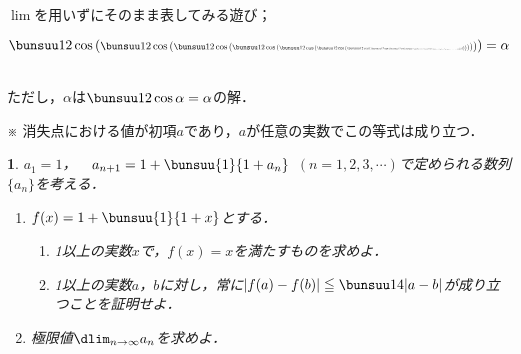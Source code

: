 \documentclass[10pt,
b5paper,
fleqn,
dvipdfmx,
uplatex
]{jsarticle}
\newtheorem{question}[Question]{}
\newcommand{\bqu}{\begin{question}}
\newcommand{\equ}{\end{question}}
\newcommand{\benu}{\begin{enumerate}}
\newcommand{\eenu}{\end{enumerate}}
\newcommand{\bb}{\bf\boldmath}%
\begin{document}
{\vfill

$\lim$を用いずにそのまま表してみる遊び；\\

{\huge 


\hfill $\bunsuu 12\cos\left(
\scalebox{0.8}{$\bunsuu 12\cos\left(
\scalebox{0.8}{$\bunsuu 12\cos\left(
\scalebox{0.8}{$\bunsuu 12\cos\left(
\scalebox{0.8}{$\bunsuu 12\cos\left(
\scalebox{0.8}{$\bunsuu 12\cos\left(
\scalebox{0.8}{$\bunsuu 12\cos\left(
\scalebox{0.8}{$\bunsuu 12\cos\left(
\scalebox{0.8}{$\bunsuu 12\cos\left(
\scalebox{0.8}{$\bunsuu 12\cos\left(
\scalebox{0.8}{$\bunsuu 12\cos\left(
\scalebox{0.8}{$\bunsuu 12\cos\left(
\scalebox{0.8}{$\bunsuu 12\cos\left(
\scalebox{0.8}{$\bunsuu 12\cos\left(
\scalebox{0.8}{$\bunsuu 12\cos\left(
\scalebox{0.8}{$\bunsuu 12\cos\left(
\scalebox{0.8}{$\bunsuu 12\cos\left(\ 
\right)$}\right)$}\right)$}\right)$}\right)$}\right)$}\right)$}\right)$}\right)$}\right)$}\right)$}\right)$}\right)$}\right)$}\right)$}\right)$}\right)=\alpha$\hfill 
}\\
\hfill ただし，$\alpha$は$\bunsuu 12\cos \alpha=\alpha$の解．


\hfill {\tiny ※ 消失点における値が初項$a$であり，$a$が任意の実数でこの等式は成り立つ．}

\vfill

\newpage

\fi

\vfill

\newpage


\bqu $a_1=1$，\ \ $a_{n+1}=1+\bunsuu{1}{1+a_n}$\ $(n=1,2,3,\cdots)$で定められる数列$\{a_n\}$を考える．
\benu
\item $f(x)=1+\bunsuu{1}{1+x}$とする．
\benu
\item 1以上の実数$x$で，$f(x)=x$を満たすものを求めよ．
\item 1以上の実数$a$，$b$に対し，常に$\left|f(a)-f(b)\right|\leqq \bunsuu 14|a-b|$が成り立つことを証明せよ．
\eenu
\item 極限値$\dlim_{n \to \infty}a_n$を求めよ．
\eenu
\equ

}
\end{document}
